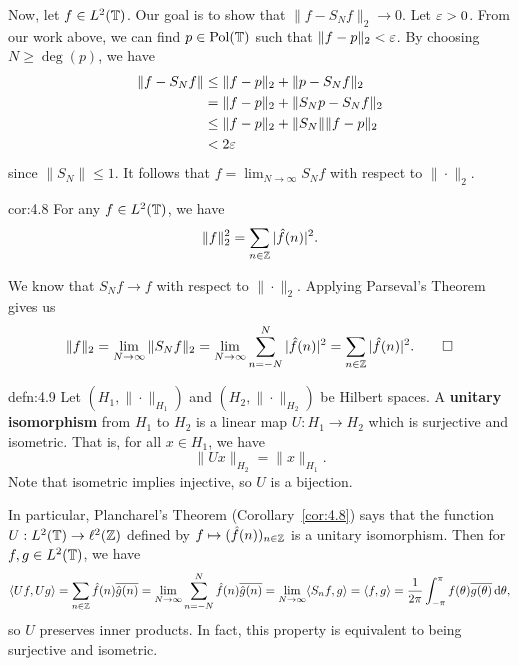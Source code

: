 \begin{pf}
    Now, let $f \in L^2(\mathbb{T})$. Our goal is to show that $\|f - S_Nf\|_2 \to 0$. 
    Let $\varepsilon > 0$. From our work above, we can find $p \in \operatorname{Pol}(\mathbb{T})$ 
    such that $\|f - p\|_2 < \varepsilon$. By choosing $N \geq \deg(p)$, we have 
    \begin{align*}
        \|f - S_Nf\| &\leq \|f - p\|_2 + \|p - S_Nf\|_2 \\ 
        &= \|f - p\|_2 + \|S_Np - S_Nf\|_2 \\ 
        &\leq \|f - p\|_2 + \|S_N\| \|f - p\|_2 \\ 
        &< 2\varepsilon 
    \end{align*}
    since $\|S_N\| \leq 1$. It follows that $f = \lim_{N\to\infty} S_Nf$ 
    with respect to $\|\cdot\|_2$. 
\end{pf}

\begin{cor}{cor:4.8}
    For any $f \in L^2(\mathbb{T})$, we have 
    \[ \|f\|_2^2 = \sum_{n\in\mathbb{Z}} |\hat f(n)|^2. \] 
\end{cor}
\begin{pf}
    We know that $S_Nf \to f$ with respect to $\|\cdot\|_2$. Applying 
    Parseval's Theorem gives us 
    \[ \|f\|_2 = \lim_{N\to\infty} \|S_N f\|_2 
    = \lim_{N\to\infty} \sum_{n=-N}^N |\hat f(n)|^2 = 
    \sum_{n\in\mathbb{Z}} |\hat f(n)|^2. \qedhere \] 
\end{pf}

\begin{defn}{defn:4.9}
    Let $(H_1, \|\cdot\|_{H_1})$ and $(H_2, \|\cdot\|_{H_2})$ be Hilbert 
    spaces. A {\bf unitary isomorphism} from $H_1$ to $H_2$ is a 
    linear map $U : H_1 \to H_2$ which is surjective and isometric. That is, 
    for all $x \in H_1$, we have 
    \[ \|Ux\|_{H_2} = \|x\|_{H_1}. \] 
    Note that isometric implies injective, so $U$ is a bijection. 
\end{defn}

In particular, Plancharel's Theorem (Corollary~\ref{cor:4.8}) says that 
the function $U : L^2(\mathbb{T}) \to \ell^2(\mathbb{Z})$ defined by $f \mapsto 
(\hat f(n))_{n\in\mathbb{Z}}$ is a unitary isomorphism. Then for 
$f, g \in L^2(\mathbb{T})$, we have 
\[ \langle Uf, Ug \rangle = \sum_{n\in\mathbb{Z}} \hat f(n) \overline{\hat g(n)} 
= \lim_{N\to\infty} \sum_{n=-N}^N \hat f(n) \overline{\hat g(n)} 
= \lim_{N\to\infty} \langle S_n f, g \rangle 
= \langle f, g \rangle 
= \frac{1}{2\pi} \int_{-\pi}^\pi f(\theta) \overline{g(\theta)} \,\mathrm{d}\theta, \] 
so $U$ preserves inner products. In fact, this property is equivalent to being 
surjective and isometric. 

